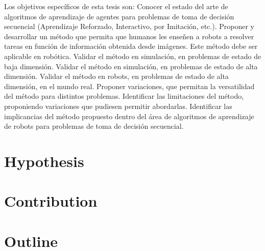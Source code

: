 \begin{intro}
Los objetivos específicos de esta tesis son:
Conocer el estado del arte de algoritmos de aprendizaje de agentes para problemas de toma de decisión secuencial (Aprendizaje Reforzado, Interactivo, por Imitación, etc.). 
Proponer y desarrollar un método que permita que humanos les enseñen a robots a resolver tareas en función de información obtenida desde imágenes. Este método debe ser aplicable en robótica.
Validar el método en simulación, en problemas de estado de baja dimensión.
Validar el método en simulación, en problemas de estado de alta dimensión.
Validar el método en robots, en problemas de estado de alta dimensión, en el mundo real. 
Proponer variaciones, que permitan la versatilidad del método para distintos problemas.
Identificar las limitaciones del método, proponiendo variaciones que pudiesen permitir abordarlas.  
Identificar las implicancias del método propuesto dentro del área de algoritmos de aprendizaje de robots para problemas de toma de decisión secuencial. 
\section{Hypothesis}
\section{Contribution}
\section{Outline}
\end{intro}